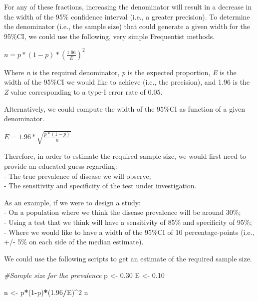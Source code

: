 \documentclass[
]{book}
\newenvironment{Shaded}{\begin{snugshade}}{\end{snugshade}}
\newcommand{\CommentTok}[1]{\textcolor[rgb]{0.56,0.35,0.01}{\textit{#1}}}
\newcommand{\DecValTok}[1]{\textcolor[rgb]{0.00,0.00,0.81}{#1}}
\newcommand{\FloatTok}[1]{\textcolor[rgb]{0.00,0.00,0.81}{#1}}
\newcommand{\NormalTok}[1]{#1}
\newcommand{\OtherTok}[1]{\textcolor[rgb]{0.56,0.35,0.01}{#1}}
\newcommand{\SpecialCharTok}[1]{\textcolor[rgb]{0.81,0.36,0.00}{\textbf{#1}}}
\begin{document}
For any of these fractions, increasing the denominator will result in a decrease in the width of the 95\% confidence interval (i.e., a greater precision). To determine the denominator (i.e., the sample size) that could generate a given width for the 95\%CI, we could use the following, very simple Frequentist methods.

\(n=p*(1-p)*(\frac{1.96}{E})^{2}\)

Where \emph{n} is the required denominator, \emph{p} is the expected proportion, \emph{E} is the width of the 95\%CI we would like to achieve (i.e., the precision), and 1.96 is the \emph{Z} value corresponding to a type-I error rate of 0.05.

Alternatively, we could compute the width of the 95\%CI as function of a given denominator.

\(E=1.96*\sqrt{\frac{p*(1-p)}{n}}\)

Therefore, in order to estimate the required sample size, we would first need to provide an educated guess regarding:\\
- The true prevalence of disease we will observe;\\
- The sensitivity and specificity of the test under investigation.

As an example, if we were to design a study:\\
- On a population where we think the disease prevalence will be around 30\%;\\
- Using a test that we think will have a sensitivity of 85\% and specificity of 95\%;\\
- Where we would like to have a width of the 95\%CI of 10 percentage-points (i.e., +/- 5\% on each side of the median estimate).

We could use the following scripts to get an estimate of the required sample size.

\begin{Shaded}
\begin{Highlighting}[]
\CommentTok{\#Sample size for the prevalence}
\NormalTok{p }\OtherTok{\textless{}{-}} \FloatTok{0.30}
\NormalTok{E }\OtherTok{\textless{}{-}} \FloatTok{0.10}

\NormalTok{n }\OtherTok{\textless{}{-}}\NormalTok{ p}\SpecialCharTok{*}\NormalTok{(}\DecValTok{1}\SpecialCharTok{{-}}\NormalTok{p)}\SpecialCharTok{*}\NormalTok{(}\FloatTok{1.96}\SpecialCharTok{/}\NormalTok{E)}\SpecialCharTok{\^{}}\DecValTok{2}
\NormalTok{n}
\end{Highlighting}
\end{Shaded}
\end{document}
